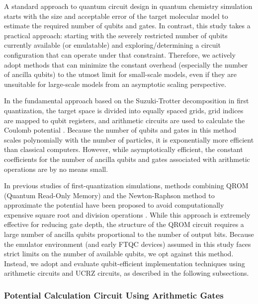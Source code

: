 \documentclass[report_2025.tex]{subfiles}
\begin{document}
A standard approach to quantum circuit design in quantum chemistry simulation
starts with the size and acceptable error of the target molecular model to
estimate the required number of qubits and gates. In contrast, this study takes
a practical approach: starting with the severely restricted number of qubits
currently available (or emulatable) and exploring/determining a circuit
configuration that can operate under that constraint. Therefore, we actively
adopt methods that can minimize the constant overhead (especially the number of
ancilla qubits) to the utmost limit for small-scale models, even if they are
unsuitable for large-scale models from an asymptotic scaling perspective.

In the fundamental approach based on the Suzuki-Trotter decomposition in first
quantization, the target space is divided into equally spaced grids, grid
indices are mapped to qubit registers, and arithmetic circuits are used to
calculate the Coulomb potential \cite{Zalka-rspa.1998.0162}. Because the number
of qubits and gates in this method scales polynomially with the number of
particles, it is exponentially more efficient than classical computers. However,
while asymptotically efficient, the constant coefficients for the number of
ancilla qubits and gates associated with arithmetic operations are by no means
small.

In previous studies of first-quantization simulations, methods combining QROM
(Quantum Read-Only Memory) and the Newton-Raphson method to approximate the
potential have been proposed to avoid computationally expensive square root and
division operations \cite{Rubin2024.pnas.2317772121,
Babbush_2018b.PhysRevX.8.041015, Sanders2020.PRXQuantum.1.020312}. While this
approach is extremely effective for reducing gate depth, the structure of the
QROM circuit requires a large number of ancilla qubits proportional to the
number of output bits. Because the emulator environment (and early FTQC devices)
assumed in this study faces strict limits on the number of available qubits, we
opt against this method. Instead, we adopt and evaluate qubit-efficient
implementation techniques using arithmetic circuits and UCRZ circuits, as
described in the following subsections.

\subsubsection{Potential Calculation Circuit Using Arithmetic Gates}
\label{subsec:potential-circuit-by-arithmetic-gates}
\end{document}
